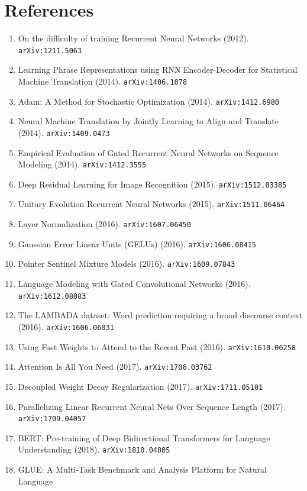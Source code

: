 \documentclass[11pt]{article}
\begin{document}
\section*{References}
\begin{enumerate}\small
  \item On the difficulty of training Recurrent Neural Networks (2012). \texttt{arXiv:1211.5063}
  \item Learning Phrase Representations using RNN Encoder-Decoder for
  Statistical Machine Translation (2014). \texttt{arXiv:1406.1078}
  \item Adam: A Method for Stochastic Optimization (2014). \texttt{arXiv:1412.6980}
  \item Neural Machine Translation by Jointly Learning to Align and Translate (2014). \texttt{arXiv:1409.0473}
  \item Empirical Evaluation of Gated Recurrent Neural Networks on Sequence
  Modeling (2014). \texttt{arXiv:1412.3555}
  \item Deep Residual Learning for Image Recognition (2015). \texttt{arXiv:1512.03385}
  \item Unitary Evolution Recurrent Neural Networks (2015). \texttt{arXiv:1511.06464}
  \item Layer Normalization (2016). \texttt{arXiv:1607.06450}
  \item Gaussian Error Linear Units (GELUs) (2016). \texttt{arXiv:1606.08415}
  \item Pointer Sentinel Mixture Models (2016). \texttt{arXiv:1609.07843}
  \item Language Modeling with Gated Convolutional Networks (2016). \texttt{arXiv:1612.08083}
  \item The LAMBADA dataset: Word prediction requiring a broad discourse context (2016). \texttt{arXiv:1606.06031}
  \item Using Fast Weights to Attend to the Recent Past (2016). \texttt{arXiv:1610.06258}
  \item Attention Is All You Need (2017). \texttt{arXiv:1706.03762}
  \item Decoupled Weight Decay Regularization (2017). \texttt{arXiv:1711.05101}
  \item Parallelizing Linear Recurrent Neural Nets Over Sequence Length (2017). \texttt{arXiv:1709.04057}
  \item BERT: Pre-training of Deep Bidirectional Transformers for Language
  Understanding (2018). \texttt{arXiv:1810.04805}
  \item GLUE: A Multi-Task Benchmark and Analysis Platform for Natural Language

\end{enumerate}
\end{document}
